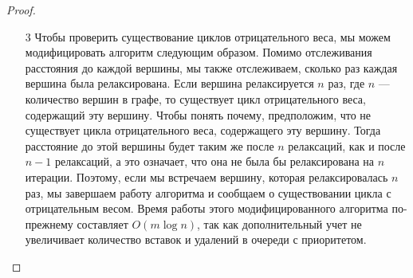 \begin{proof}
\begin{itemize}
\item[3] Чтобы проверить существование циклов отрицательного веса, мы можем модифицировать алгоритм следующим образом. Помимо отслеживания расстояния до каждой вершины, мы также отслеживаем, сколько раз каждая вершина была релаксирована. Если вершина релаксируется $n$ раз, где $n$ — количество вершин в графе, то существует цикл отрицательного веса, содержащий эту вершину. Чтобы понять почему, предположим, что не существует цикла отрицательного веса, содержащего эту вершину. Тогда расстояние до этой вершины будет таким же после $n$ релаксаций, как и после $n-1$ релаксаций, а это означает, что она не была бы релаксирована на $n$ итерации. Поэтому, если мы встречаем вершину, которая релаксировалась $n$ раз, мы завершаем работу алгоритма и сообщаем о существовании цикла с отрицательным весом. Время работы этого модифицированного алгоритма по-прежнему составляет $O(m\log n)$, так как дополнительный учет не увеличивает количество вставок и удалений в очереди с приоритетом.
\end{itemize}
\end{proof}
\vskip 0.6in

